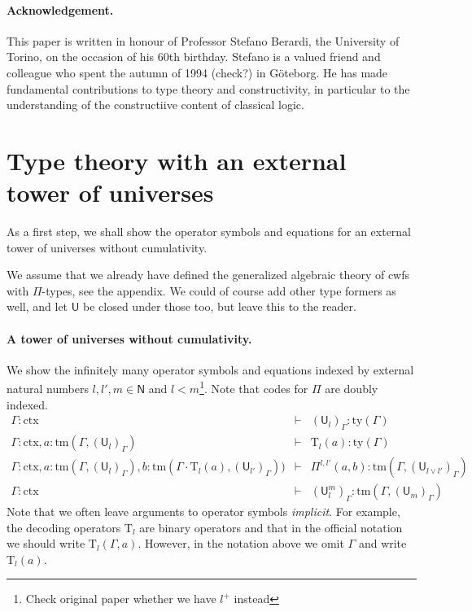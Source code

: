 \documentclass[11pt,a4paper]{article}
\theoremstyle{definition}
\newcommand{\NN}{\mathsf{N}}
\newcommand{\UU}{\mathsf{U}}
\def\NN{\mathsf{N}}
\def\UU{\mathsf{U}}
\newcommand{\N}{\mathsf{N}}
\def\Pihat{\Pi}
\newcommand{\ctx}{\mathrm{ctx}}
\newcommand{\ty}{\mathrm{ty}}
\newcommand{\tm}{\mathrm{tm}}
\def\U{\mathsf{U}}
\newcommand{\Ta}{\mathrm{T}}
\begin{document}
\paragraph{Acknowledgement.} This paper is written in honour of Professor Stefano Berardi, the University of Torino, on the occasion of his 60th birthday. Stefano is a valued friend and colleague who spent the autumn of 1994 (check?) in Göteborg. He has made fundamental contributions to type theory and constructivity, in particular to the understanding of the constructiive content of classical logic.

\section{Type theory with an external tower of universes}

As a first step, we shall show the operator symbols and equations for an external tower of universes without cumulativity. %

We assume that we already have defined the generalized algebraic theory of cwfs with $\Pi$-types, see the appendix. We could of course add other type formers as well, and let $\UU$ be closed under those too, but leave this to the reader. 

\paragraph{A tower of universes without cumulativity.} We show the infinitely many operator symbols and equations indexed by external natural numbers $l, l' , m \in \NN$ and $l < m$\footnote{Check original paper whether we have $l^+$ instead}.
Note that codes for $\Pi$ are doubly indexed.
\begin{eqnarray*}
\Gamma : \ctx &\vdash& (\U_{l})_\Gamma : \ty(\Gamma)\\
\Gamma : \ctx, a : \tm(\Gamma,(\U_{l})_\Gamma) &\vdash& {\Ta_{l}}(a) : \ty(\Gamma)\\
\Gamma : \ctx,
a : \tm(\Gamma,(\U_{l})_\Gamma),
b :  \tm(\Gamma \cdot \Ta_{l}(a), (\U_{l'})_\Gamma))
&\vdash&
 \Pihat^{l,l'}(a,b) : \tm(\Gamma,(\U_{l \vee l'})_\Gamma)\\
 \Gamma : \ctx&\vdash&(\UU^m_l)_\Gamma: \tm(\Gamma,(\UU_{m})_\Gamma)
\end{eqnarray*}
Note that we often leave arguments to operator symbols {\em implicit}. For example, the decoding operators $\Ta_l$ are binary operators and that in the official notation we should write $\Ta_l(\Gamma,a)$. However, in the notation above we omit $\Gamma$ and write $\Ta_l(a)$.
\end{document}
